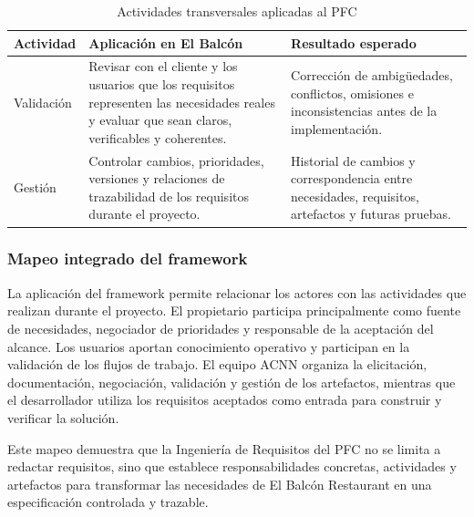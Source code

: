 \begin{table}[H]
\centering
\footnotesize
\caption{Actividades transversales aplicadas al PFC}
\label{tab:actividades-transversales}
\begin{tabularx}{\textwidth}{@{}p{}YY@{}}
\toprule
\textbf{Actividad} &
\textbf{Aplicación en El Balcón} &
\textbf{Resultado esperado} \\
\midrule

Validación &
Revisar con el cliente y los usuarios que los requisitos representen las
necesidades reales y evaluar que sean claros, verificables y coherentes. &
Corrección de ambigüedades, conflictos, omisiones e inconsistencias antes de
la implementación. \\

Gestión &
Controlar cambios, prioridades, versiones y relaciones de trazabilidad de
los requisitos durante el proyecto. &
Historial de cambios y correspondencia entre necesidades, requisitos,
artefactos y futuras pruebas. \\

\bottomrule
\end{tabularx}
\end{table}

\subsubsection{Mapeo integrado del framework}

La aplicación del framework permite relacionar los actores con las actividades
que realizan durante el proyecto. El propietario participa principalmente
como fuente de necesidades, negociador de prioridades y responsable de la
aceptación del alcance. Los usuarios aportan conocimiento operativo y
participan en la validación de los flujos de trabajo. El equipo ACNN organiza
la elicitación, documentación, negociación, validación y gestión de los
artefactos, mientras que el desarrollador utiliza los requisitos aceptados
como entrada para construir y verificar la solución.

Este mapeo demuestra que la Ingeniería de Requisitos del PFC no se limita a
redactar requisitos, sino que establece responsabilidades concretas,
actividades y artefactos para transformar las necesidades de El Balcón
Restaurant en una especificación controlada y trazable.
